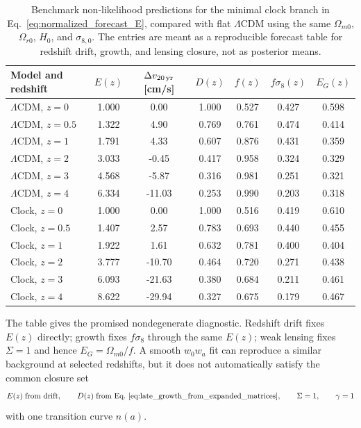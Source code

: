 \documentclass[aps,prd,reprint,nofootinbib,superscriptaddress,longbibliography]{revtex4-2}
\newcommand{\LCDM}{$\Lambda$CDM}
\begin{document}
\begin{table}[t]
\footnotesize
\caption{Benchmark non-likelihood predictions for the minimal clock branch in Eq.~\eqref{eq:normalized_forecast_E}, compared with flat \LCDM{} using the same $\Omega_{m0}$, $\Omega_{r0}$, $H_0$, and $\sigma_{8,0}$. The entries are meant as a reproducible forecast table for redshift drift, growth, and lensing closure, not as posterior means.}
\begin{ruledtabular}
\begin{tabular}{lcccccc}
Model and redshift & $E(z)$ & $\Delta v_{20\,{\rm yr}}$ [cm/s] & $D(z)$ & $f(z)$ & $f\sigma_8(z)$ & $E_G(z)$ \\
\hline
\LCDM, $z=0$   & 1.000 & 0.00   & 1.000 & 0.527 & 0.427 & 0.598 \\
\LCDM, $z=0.5$ & 1.322 & 4.90   & 0.769 & 0.761 & 0.474 & 0.414 \\
\LCDM, $z=1$   & 1.791 & 4.33   & 0.607 & 0.876 & 0.431 & 0.359 \\
\LCDM, $z=2$   & 3.033 & -0.45  & 0.417 & 0.958 & 0.324 & 0.329 \\
\LCDM, $z=3$   & 4.568 & -5.87  & 0.316 & 0.981 & 0.251 & 0.321 \\
\LCDM, $z=4$   & 6.334 & -11.03 & 0.253 & 0.990 & 0.203 & 0.318 \\
Clock, $z=0$   & 1.000 & 0.00   & 1.000 & 0.516 & 0.419 & 0.610 \\
Clock, $z=0.5$ & 1.407 & 2.57   & 0.783 & 0.693 & 0.440 & 0.455 \\
Clock, $z=1$   & 1.922 & 1.61   & 0.632 & 0.781 & 0.400 & 0.404 \\
Clock, $z=2$   & 3.777 & -10.70 & 0.464 & 0.720 & 0.271 & 0.438 \\
Clock, $z=3$   & 6.093 & -21.63 & 0.380 & 0.684 & 0.211 & 0.461 \\
Clock, $z=4$   & 8.622 & -29.94 & 0.327 & 0.675 & 0.179 & 0.467 \\
\end{tabular}
\end{ruledtabular}
\label{tab:drift_growth_lensing_forecast_addendum}
\end{table}

The table gives the promised nondegenerate diagnostic. Redshift drift fixes $E(z)$ directly; growth fixes $f\sigma_8$ through the same $E(z)$; weak lensing fixes $\Sigma=1$ and hence $E_G=\Omega_{m0}/f$. A smooth $w_0w_a$ fit can reproduce a similar background at selected redshifts, but it does not automatically satisfy the common closure set
\begin{equation}
  E(z)\;\hbox{from drift},
  \qquad
  D(z)\;\hbox{from Eq.~\eqref{eq:late_growth_from_expanded_matrices}},
  \qquad
  \Sigma=1,
  \qquad
  \gamma=1
\end{equation}
with one transition curve $n(a)$.
\end{document}
